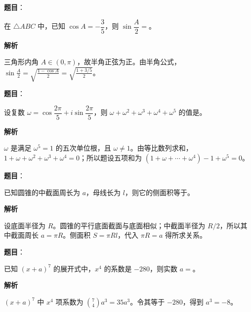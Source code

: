 \begin{answer}

\textbf{题目}：

在 $\triangle ABC$ 中，已知 $\cos A=-\dfrac35$，则 $\sin\dfrac A2=$\gkblank{}。

\textbf{解析}

三角形内角 $A\in(0,\pi)$，故半角正弦为正。由半角公式，$\sin\frac A2=\sqrt{\frac{1-\cos A}{2}}=\sqrt{\frac{1+3/5}{2}}$。


\end{answer}
\begin{answer}

\textbf{题目}：

设复数 $\omega=\cos\dfrac{2\pi}{5}+i\sin\dfrac{2\pi}{5}$，则 $\omega+\omega^2+\omega^3+\omega^4+\omega^5$ 的值是\gkblank{}。

\textbf{解析}

$\omega$ 是满足 $\omega^5=1$ 的五次单位根，且 $\omega\ne1$。由等比数列求和，$1+\omega+\omega^2+\omega^3+\omega^4=0$；所以题设五项和为 $(1+\omega+\cdots+\omega^4)-1+\omega^5=0$。


\end{answer}
\begin{answer}

\textbf{题目}：

已知圆锥的中截面周长为 $a$，母线长为 $l$，则它的侧面积等于\gkblank{}。

\textbf{解析}

设底面半径为 $R$。圆锥的平行底面截面与底面相似；中截面半径为 $R/2$，所以其中截面周长 $a=\pi R$。侧面积 $S=\pi Rl$，代入 $\pi R=a$ 得所求关系。


\end{answer}
\begin{answer}

\textbf{题目}：

已知 $(x+a)^7$ 的展开式中，$x^4$ 的系数是 $-280$，则实数 $a=$\gkblank{}。

\textbf{解析}

$(x+a)^7$ 中 $x^4$ 项系数为 $\binom74a^3=35a^3$。令其等于 $-280$，得到 $a^3=-8$。


\end{answer}
